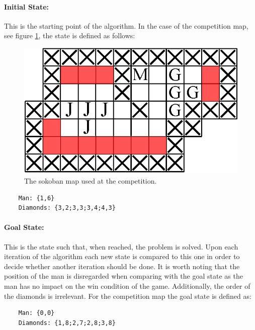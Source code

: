 \paragraph{Initial State:}
\label{sec:initialstate}
This is the starting point of the algorithm. 
In the case of the competition map, see figure \ref{fig:competitionmap}, the state is defined as follows:

\begin{figure}
	\centering
	\includegraphics[width=.75\linewidth]{images/competitionmap}
	\caption{The sokoban map used at the competition.}
	\label{fig:competitionmap}
\end{figure}

\begin{lstlisting}
	Man: {1,6}
	Diamonds: {3,2;3,3;3,4;4,3}
\end{lstlisting}

\paragraph{Goal State:}
This is the state such that, when reached, the problem is solved. 
Upon each iteration of the algorithm each new state is compared to this one in order to decide whether another iteration should be done.
It is worth noting that the position of the man is disregarded when comparing with the goal state as the man has no impact on the win condition of the game.
Additionally, the order of the diamonds is irrelevant.
For the competition map the goal state is defined as:

\begin{lstlisting}
	Man: {0,0}
	Diamonds: {1,8;2,7;2,8;3,8}
\end{lstlisting}

